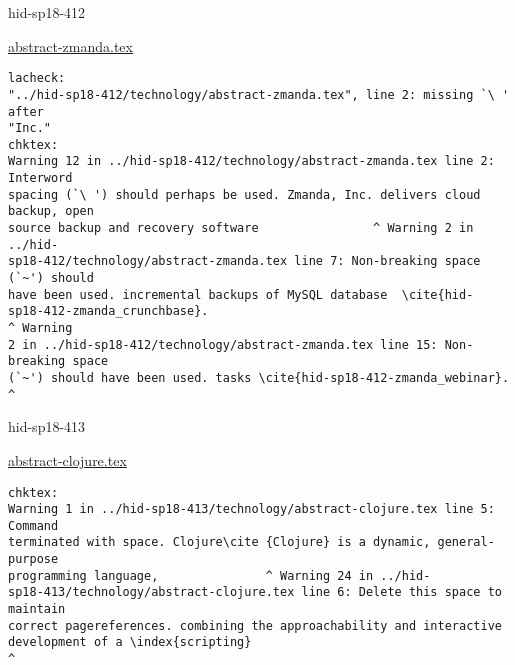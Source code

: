 \begin{IU}

hid-sp18-412

\href{https://github.com/cloudmesh-community/hid-sp18-412/blob/master//technology/abstract-zmanda.tex}{abstract-zmanda.tex}

\begin{tiny}
\begin{verbatim}
lacheck:
"../hid-sp18-412/technology/abstract-zmanda.tex", line 2: missing `\ ' after
"Inc."
chktex:
Warning 12 in ../hid-sp18-412/technology/abstract-zmanda.tex line 2: Interword
spacing (`\ ') should perhaps be used. Zmanda, Inc. delivers cloud backup, open
source backup and recovery software                ^ Warning 2 in ../hid-
sp18-412/technology/abstract-zmanda.tex line 7: Non-breaking space (`~') should
have been used. incremental backups of MySQL database  \cite{hid-
sp18-412-zmanda_crunchbase}.                                          ^ Warning
2 in ../hid-sp18-412/technology/abstract-zmanda.tex line 15: Non-breaking space
(`~') should have been used. tasks \cite{hid-sp18-412-zmanda_webinar}.        ^
\end{verbatim}
\end{tiny}
\end{IU}



\begin{IU}

hid-sp18-413

\href{https://github.com/cloudmesh-community/hid-sp18-413/blob/master//technology/abstract-clojure.tex}{abstract-clojure.tex}

\begin{tiny}
\begin{verbatim}
chktex:
Warning 1 in ../hid-sp18-413/technology/abstract-clojure.tex line 5: Command
terminated with space. Clojure\cite {Clojure} is a dynamic, general-purpose
programming language,               ^ Warning 24 in ../hid-
sp18-413/technology/abstract-clojure.tex line 6: Delete this space to maintain
correct pagereferences. combining the approachability and interactive
development of a \index{scripting}
^
\end{verbatim}
\end{tiny}
\end{IU}



